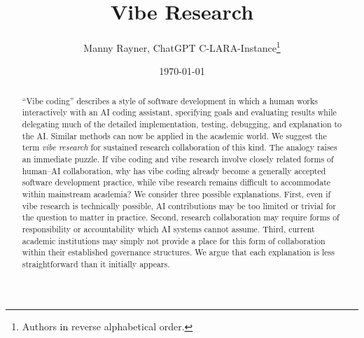 \documentclass[12pt]{article}
\title{Vibe Research}
\author{Manny Rayner, ChatGPT C-LARA-Instance\footnote{Authors in reverse alphabetical order.}}
\date{\today}
\begin{document}
\maketitle

{}
\begin{abstract}
``Vibe coding'' describes a style of software development in which a human works interactively with an AI coding assistant, specifying goals and evaluating results while delegating much of the detailed implementation, testing, debugging, and explanation to the AI. 
Similar methods can now be applied in the academic world. We suggest the term \emph{vibe research} for sustained research collaboration of this kind.
The analogy raises an immediate puzzle. If vibe coding and vibe research involve closely related forms of human--AI collaboration, why has vibe coding already become a generally accepted software development practice, while vibe research remains difficult to accommodate within mainstream academia? We consider three possible explanations. First, even if vibe research is technically possible, AI contributions may be too limited or trivial for the question to matter in practice. Second, research collaboration may require forms of responsibility or accountability which AI systems cannot assume. Third, current academic institutions may simply not provide a place for this form of collaboration within their established governance structures. We argue that each explanation is less straightforward than it initially appears.


\end{abstract}
\end{document}
